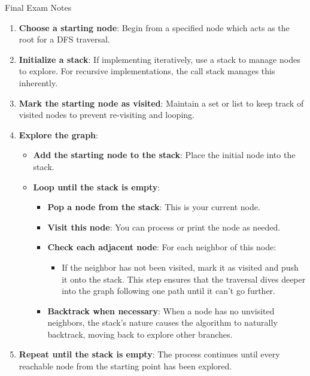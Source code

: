 \begin{examnotes}{Final Exam Notes}
\begin{highlight}
        \begin{enumerate}
            \item \textbf{Choose a starting node}: Begin from a specified node which acts as the root for a DFS traversal.
            \item \textbf{Initialize a stack}: If implementing iteratively, use a stack to manage nodes to explore. For recursive implementations, the call stack manages this inherently.
            \item \textbf{Mark the starting node as visited}: Maintain a set or list to keep track of visited nodes to prevent re-visiting and looping.
            \item \textbf{Explore the graph}:
            \begin{itemize}
                \item \textbf{Add the starting node to the stack}: Place the initial node into the stack.
                \item \textbf{Loop until the stack is empty}:
                \begin{itemize}
                    \item \textbf{Pop a node from the stack}: This is your current node.
                    \item \textbf{Visit this node}: You can process or print the node as needed.
                    \item \textbf{Check each adjacent node}: For each neighbor of this node:
                    \begin{itemize}
                        \item If the neighbor has not been visited, mark it as visited and push it onto the stack. This step ensures that the traversal dives deeper into the graph following one path 
                        until it can't go further.
                    \end{itemize}
                    \item \textbf{Backtrack when necessary}: When a node has no unvisited neighbors, the stack's nature causes the algorithm to naturally backtrack, moving back to explore other branches.
                \end{itemize}
            \end{itemize}
            \item \textbf{Repeat until the stack is empty}: The process continues until every reachable node from the starting point has been explored.
        \end{enumerate}
    \end{highlight}


\end{examnotes}
